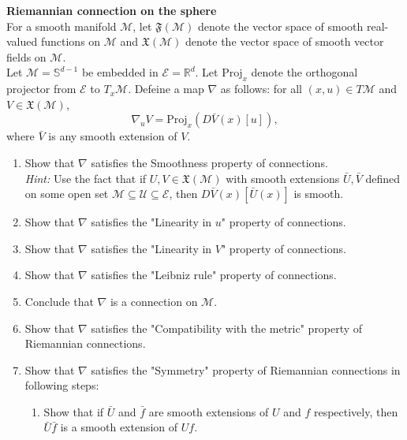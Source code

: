 \documentclass[en, oneside]{assignment}
\begin{document}
\begin{prob} \textbf{Riemannian connection on the sphere}\\
    For a smooth manifold $\mathcal{M}$, 
    let $\mathfrak{F} (\mathcal{M})$ denote the vector space of smooth real-valued functions on $\mathcal{M}$ 
    and $\mathfrak{X} (\mathcal{M})$ denote the vector space of smooth vector fields on $\mathcal{M}$.\\
    Let $\mathcal{M} = \mathbb{S}^{d-1}$ be embedded in $\mathcal{E} = \mathbb{R}^d$. 
    Let $\text{Proj} _x$ denote the orthogonal projector from $\mathcal{E}$ to $T_x \mathcal{M}$.
    Defeine a map $\nabla$ as follows: for all $(x, u) \in T\mathcal{M}$ and $V \in \mathfrak{X} (\mathcal{M})$,
    \begin{equation*}
        \nabla _u V = \text{Proj} _x \left( D \bar{V} (x) [u] \right),
    \end{equation*}
    where $\bar{V}$ is any smooth extension of $V$.
    \begin{enumerate}[label=(\arabic*)]
        \item Show that $\nabla$ satisfies the Smoothness property of connections.\\
        \textit{Hint:} Use the fact that if $U, V \in \mathfrak{X} (\mathcal{M})$ 
        with smooth extensions $\bar{U}, \bar{V}$ defined on some open set $\mathcal{M} \subseteq \mathcal{U} \subseteq \mathcal{E}$, 
        then $D \bar{V} (x) [ \bar{U} (x) ]$ is smooth.
        \item Show that $\nabla$ satisfies the "Linearity in $u$" property of connections.
        \item Show that $\nabla$ satisfies the "Linearity in $V$" property of connections.
        \item Show that $\nabla$ satisfies the "Leibniz rule" property of connections.
        \item Conclude that $\nabla$ is a connection on $\mathcal{M}$.
        \item Show that $\nabla$ satisfies the "Compatibility with the metric" property of Riemannian connections.
        \item Show that $\nabla$ satisfies the "Symmetry" property of Riemannian connections in following steps:
        \begin{enumerate}[label=(\alph*)]
            \item Show that if $\bar{U}$ and $\bar{f}$ are smooth extensions of $U$ and $f$ respectively, then $\bar{U} \bar{f}$ is a smooth extension of $U f$.\\

\end{enumerate}
\end{enumerate}
\end{prob}
\end{document}

